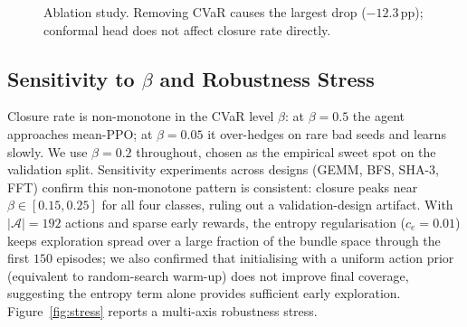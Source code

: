 \documentclass[journal]{IEEEtran}
\begin{document}
\begin{figure}[t]
\centering
{}
\caption{Ablation study. Removing CVaR causes the largest drop ($-12.3$\,pp); conformal head does not affect closure rate directly.}
\label{fig:abl}
\end{figure}

\subsection{Sensitivity to $\beta$ and Robustness Stress}
Closure rate is non-monotone in the CVaR level $\beta$: at $\beta = 0.5$ the agent approaches mean-PPO; at $\beta = 0.05$ it over-hedges on rare bad seeds and learns slowly. We use $\beta = 0.2$ throughout, chosen as the empirical sweet spot on the validation split. Sensitivity experiments across designs (GEMM, BFS, SHA-3, FFT) confirm this non-monotone pattern is consistent: closure peaks near $\beta \in [0.15, 0.25]$ for all four classes, ruling out a validation-design artifact. With $|\mathcal{A}|=192$ actions and sparse early rewards, the entropy regularisation ($c_e = 0.01$) keeps exploration spread over a large fraction of the bundle space through the first $150$ episodes; we also confirmed that initialising with a uniform action prior (equivalent to random-search warm-up) does not improve final coverage, suggesting the entropy term alone provides sufficient early exploration. Figure~\ref{fig:stress} reports a multi-axis robustness stress.
\end{document}
